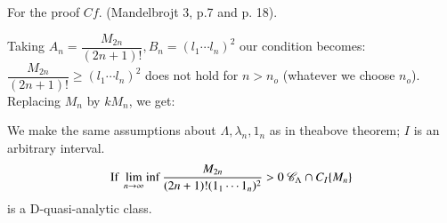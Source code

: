 For the proof $Cf$. (Mandelbrojt 3, p.7 and p. 18).

Taking $A_n = \dfrac{M_{2n}}{(2n + 1)!}, B_n = (l_1 \cdots l_n)^2$ our
condition becomes: $\dfrac{M_{2n}}{(2n + 1)!} \ge (l_1 \cdots l_n)^2$
does not hold for $n > n_o$ (whatever we choose $n_o$). Replacing
$M_n$ by $kM_n$, we get: 
\begin{theorem*}%
 We make the same assumptions about $\Lambda, \lambda_n, 1_n$ as in
 the\break above theorem; $I$ is an arbitrary interval. 
$$\mbox{\rm If } \lim\limits_{n
 \to \infty} \inf \dfrac{M_{2n}}{(2n + 1) ! (1_1 \cdots 1_n)^2}> 0~
 \mathscr{C}_\Lambda \cap C_I \{M_n\}$$ 
is a D-quasi-analytic class. 
\end{theorem*}
